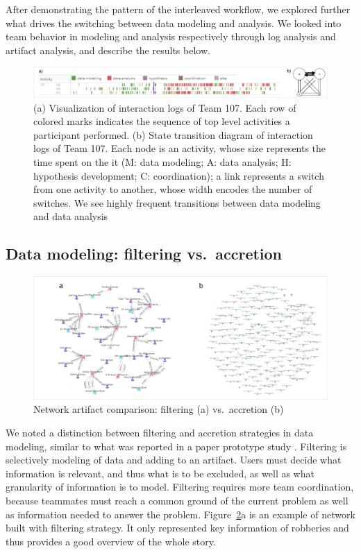 After demonstrating the pattern of the interleaved workflow, we explored further what drives the switching between data modeling and analysis. We looked into team behavior in modeling and analysis respectively through log analysis and artifact analysis, and describe the results below.

\begin{figure}
\centering
\includegraphics[width=6.5in]{./img/intertwined.jpg}
\caption{(a) Visualization of interaction logs of Team 107. Each row of
colored marks indicates the sequence of top level activities a
participant performed. (b) State transition diagram of interaction logs of Team 107. Each node is an activity, whose size represents the time spent on the it (M: data modeling; A: data analysis; H: hypothesis development; C: coordination); a
link represents a switch from one activity to another, whose width
encodes the number of switches. We see highly frequent transitions between data modeling and data analysis \label{fig:interleaving}}
\end{figure}


\subsection{Data modeling: filtering vs.~accretion}\label{data-modeling-accretion-vs.filtering}

\begin{figure}
\centering
\includegraphics[width=\columnwidth]{./img/network_accretion_filter.png}
\caption{Network artifact comparison: filtering (a)
vs.~accretion (b) \label{fig:network_accretion}}
\end{figure}

We noted a distinction between filtering and accretion
strategies in data modeling, similar to what was reported in a paper prototype study \cite{Carroll2013}. Filtering is selectively modeling of data
and adding to an artifact. Users must decide what information is
relevant, and thus what is to be excluded, as well as what granularity
of information is to model. Filtering requires more team coordination,
because teammates must reach a common ground of the current problem as
well as information needed to answer the problem. Figure~\ref{fig:network_accretion}a is an example of network built with filtering strategy. It only represented key information of robberies and thus provides a good overview of the whole story.

